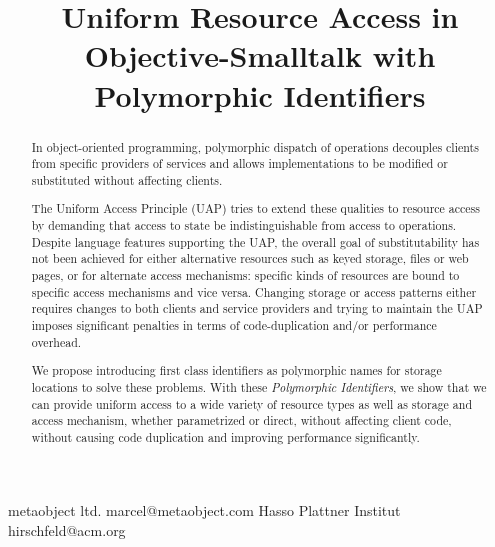 \documentclass[preprint]{sigplanconf}
\begin{document}

\linespread{0.9}

\copyrightdata{[to be supplied]} 



\title{Uniform Resource Access in Objective-Smalltalk with Polymorphic Identifiers}



           {metaobject ltd.}
           {marcel@metaobject.com}
           {Hasso Plattner Institut}
           {hirschfeld@acm.org}


\maketitle

\begin{abstract}

In object-oriented programming, polymorphic dispatch of operations
decouples clients from specific providers of services and allows 
implementations to be modified or substituted without affecting clients. 

The Uniform Access Principle (UAP) tries to extend these qualities to 
resource access by demanding that access to state be indistinguishable
from access to operations.  Despite language features supporting the
UAP, the overall goal of substitutability has not been achieved for
either alternative resources such as keyed storage, files or web pages, or for alternate 
access mechanisms:    
specific kinds of resources are bound to specific access mechanisms and vice versa.
Changing storage or access patterns either requires changes to both clients and
service providers and trying to maintain the UAP imposes significant penalties in terms of
code-duplication and/or performance overhead.

We propose introducing first class identifiers as polymorphic names for storage locations
to solve these problems.  With these \emph{Polymorphic Identifiers}, we show that
we can provide uniform access to a wide variety of resource types as well as 
storage and access mechanism, whether parametrized or direct, without affecting
client code, without causing code duplication and improving performance significantly.

\end{abstract}
\end{document}
